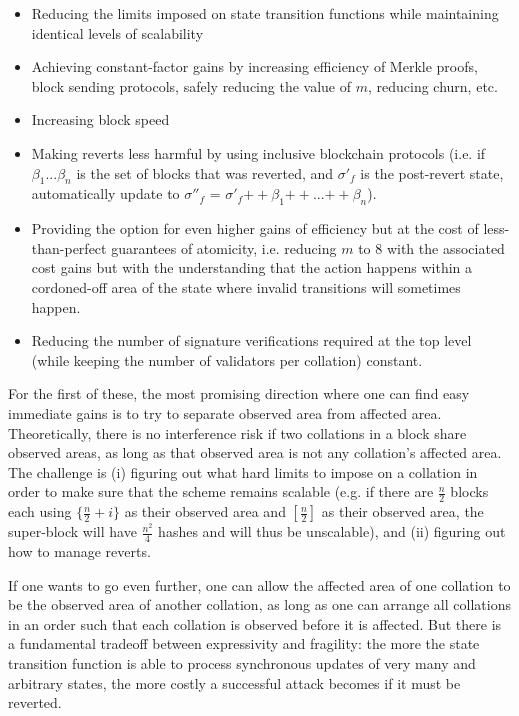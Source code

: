 \documentclass[11pt,a4paper]{article}
\makeatletter
\theoremstyle{plain}
\theoremstyle{definition}
\theoremstyle{remark}
\newcommand{\ie}{i.e.\@\xspace}
\newcommand{\eg}{e.g.\@\xspace}
\makeatother
\begin{document}
\begin{itemize}
\item
Reducing the limits imposed on state transition functions while maintaining identical levels of scalability
\item
Achieving constant-factor gains by increasing efficiency of Merkle proofs, block sending protocols, safely reducing the value of $m$, reducing churn, etc.
\item
Increasing block speed
\item
Making reverts less harmful by using inclusive blockchain protocols (\ie if $\beta_1 ... \beta_n$ is the set of blocks that was reverted, and $\sigma'_f$ is the post-revert state, automatically update to $\sigma''_f$ = $\sigma'_f {++} \beta_1 {++} ... {++} \beta_n$).
\item
Providing the option for even higher gains of efficiency but at the cost of less-than-perfect guarantees of atomicity, \ie reducing $m$ to $8$ with the associated cost gains but with the understanding that the action happens within a cordoned-off area of the state where invalid transitions will sometimes happen.
\item
Reducing the number of signature verifications required at the top level (while keeping the number of validators per collation) constant.
\end{itemize}

For the first of these, the most promising direction where one can find easy immediate gains is to try to separate observed area from affected area. Theoretically, there is no interference risk if two collations in a block share observed areas, as long as that observed area is not any collation's affected area. The challenge is (i) figuring out what hard limits to impose on a collation in order to make sure that the scheme remains scalable (\eg if there are $\frac{n}{2}$ blocks each using $\{\frac{n}{2}+i\}$ as their observed area and $[\frac{n}{2}]$ as their observed area, the super-block will have $\frac{n^2}{4}$ hashes and will thus be unscalable), and (ii) figuring out how to manage reverts.

If one wants to go even further, one can allow the affected area of one collation to be the observed area of another collation, as long as one can arrange all collations in an order such that each collation is observed before it is affected. But there is a fundamental tradeoff between expressivity and fragility: the more the state transition function is able to process synchronous updates of very many and arbitrary states, the more costly a successful attack becomes if it must be reverted.
\end{document}
